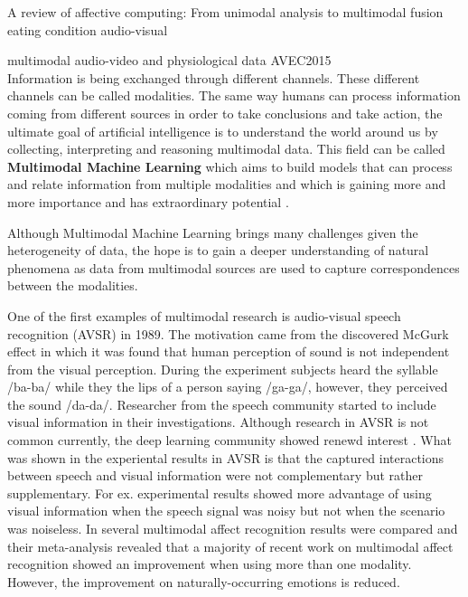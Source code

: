 A review of affective computing: From unimodal analysis to multimodal fusion\cite{Poria2017}\\

 eating condition audio-visual\cite{Schuller2015interspeech}

multimodal audio-video and physiological data AVEC2015 \cite{Ringeval2015}\\


Information is being exchanged through different channels. These different channels can be called modalities. The same way humans can process information coming from different sources in order to take conclusions and take action, the ultimate goal of artificial intelligence is to understand the world around us by collecting, interpreting and reasoning multimodal data. This field can be called \textbf{Multimodal Machine Learning} which aims to build models that can process and relate information from multiple modalities and which is gaining more and more importance and has extraordinary potential \cite{Baltruvsaitis2017multimodal}.

Although Multimodal Machine Learning brings many challenges given the heterogeneity of data, the hope is to gain a deeper understanding of natural phenomena as data from multimodal sources are used to capture correspondences between the modalities.

One of the first examples of multimodal research is audio-visual speech recognition (AVSR) in 1989. The motivation came from the discovered McGurk effect in which it was found that human perception of sound is not independent from the visual perception. During the experiment subjects heard the syllable /ba-ba/ while they the lips of a person saying /ga-ga/, however, they perceived the sound /da-da/. Researcher from the speech community started to include visual information in their investigations. Although research in AVSR is not common currently, the deep learning community showed renewd interest \cite{Ngiam2011}. What was shown in the experiental results in AVSR is that the captured interactions between speech and visual information were not complementary but rather supplementary. For ex. experimental results showed more advantage of using visual information when the speech signal was noisy but not when the scenario was noiseless.
In \cite{Dmello2015review} several multimodal affect recognition results were compared and their meta-analysis revealed that a majority of recent work on multimodal affect recognition showed an improvement when using more than one modality. However, the improvement on naturally-occurring emotions is reduced. 

